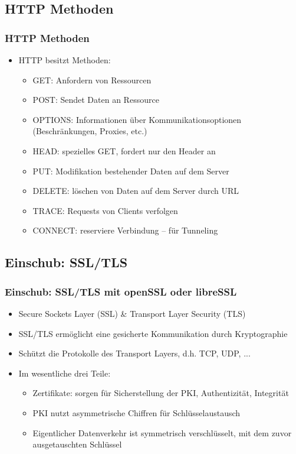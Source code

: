 \documentclass[xcolor=dvipsnames, aspectratio=169]{beamer}
\begin{document}
\subsection{HTTP Methoden}
\begin{frame}
	\frametitle{HTTP Methoden}
	\begin{itemize}
		\item HTTP besitzt Methoden:
		\begin{itemize}
			\item GET: Anfordern von Ressourcen
			\item POST: Sendet Daten an Ressource
			\item OPTIONS: Informationen über Kommunikationsoptionen (Beschränkungen, Proxies, etc.)
			\item HEAD: spezielles GET, fordert nur den Header an
			\item PUT: Modifikation bestehender Daten auf dem Server
			\item DELETE: löschen von Daten auf dem Server durch URL
			\item TRACE: Requests von Clients verfolgen
			\item CONNECT: reserviere Verbindung -- für Tunneling
		\end{itemize} 
	\end{itemize}
\end{frame}

\subsection{Einschub: SSL/TLS}
\begin{frame}
	\frametitle{Einschub: SSL/TLS mit openSSL oder libreSSL}
	\begin{itemize}
		\item Secure Sockets Layer (SSL) \& Transport Layer Security (TLS)
		\item SSL/TLS ermöglicht eine gesicherte Kommunikation durch Kryptographie
		\item Schützt die Protokolle des Transport Layers, d.h. TCP, UDP, ... 
		\item Im wesentliche drei Teile:
		\begin{itemize}
			\item Zertifikate: sorgen für Sicherstellung der PKI, Authentizität, Integrität
			\item PKI nutzt asymmetrische Chiffren für Schlüsselaustausch
			\item Eigentlicher Datenverkehr ist symmetrisch verschlüsselt, mit dem zuvor ausgetauschten Schlüssel
		\end{itemize}
	\end{itemize}
\end{frame}
\end{document}
